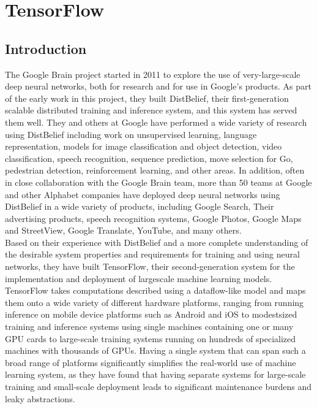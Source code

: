 \section{TensorFlow}
\label{chap:TensorFlow}

  \subsection{Introduction}
    The Google Brain project started in 2011 to explore the use of very-large-scale deep neural networks, both for research and for use in Google’s products. As part of the early work in this project, they built DistBelief, their first-generation scalable distributed training and inference system, and this system has served them well. They and others at Google have performed a wide variety of research using DistBelief including work on unsupervised learning, language representation, models for image classification and object detection, video classification, speech recognition, sequence prediction, move selection for Go, pedestrian detection, reinforcement learning, and other areas. In addition, often in close collaboration with the Google Brain team, more than 50 teams at Google and other Alphabet companies have deployed deep neural networks using DistBelief in a wide variety of products, including Google Search, Their advertising products, speech recognition systems, Google Photos, Google Maps and StreetView, Google Translate, YouTube, and many others.\cite{tensorflow2015-whitepaper}\\
    Based on their experience with DistBelief and a more complete understanding of the desirable system properties and requirements for training and using neural networks, they have built TensorFlow, their second-generation system for the implementation and deployment of largescale machine learning models. TensorFlow takes computations described using a dataflow-like model and maps them onto a wide variety of different hardware platforms, ranging from running inference on mobile device platforms such as Android and iOS to modestsized training and inference systems using single machines containing one or many GPU cards to large-scale training systems running on hundreds of specialized machines with thousands of GPUs. Having a single system that can span such a broad range of platforms significantly simplifies the real-world use of machine learning system, as they have found that having separate systems for large-scale training and small-scale deployment leads to significant maintenance burdens and leaky abstractions.\cite{tensorflow2015-whitepaper}\\

